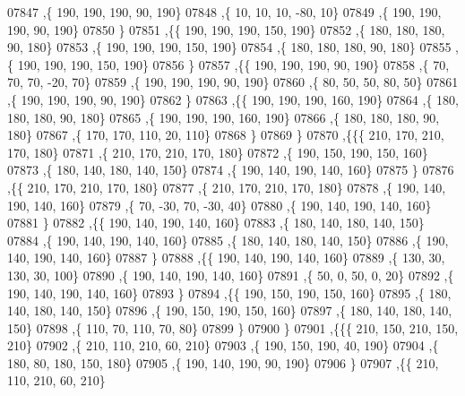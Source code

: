 \begin{DoxyCode}
07847     ,\{   190,   190,   190,    90,   190\}
07848     ,\{    10,    10,    10,   -80,    10\}
07849     ,\{   190,   190,   190,    90,   190\}
07850     \}
07851    ,\{\{   190,   190,   190,   150,   190\}
07852     ,\{   180,   180,   180,    90,   180\}
07853     ,\{   190,   190,   190,   150,   190\}
07854     ,\{   180,   180,   180,    90,   180\}
07855     ,\{   190,   190,   190,   150,   190\}
07856     \}
07857    ,\{\{   190,   190,   190,    90,   190\}
07858     ,\{    70,    70,    70,   -20,    70\}
07859     ,\{   190,   190,   190,    90,   190\}
07860     ,\{    80,    50,    50,    80,    50\}
07861     ,\{   190,   190,   190,    90,   190\}
07862     \}
07863    ,\{\{   190,   190,   190,   160,   190\}
07864     ,\{   180,   180,   180,    90,   180\}
07865     ,\{   190,   190,   190,   160,   190\}
07866     ,\{   180,   180,   180,    90,   180\}
07867     ,\{   170,   170,   110,    20,   110\}
07868     \}
07869    \}
07870   ,\{\{\{   210,   170,   210,   170,   180\}
07871     ,\{   210,   170,   210,   170,   180\}
07872     ,\{   190,   150,   190,   150,   160\}
07873     ,\{   180,   140,   180,   140,   150\}
07874     ,\{   190,   140,   190,   140,   160\}
07875     \}
07876    ,\{\{   210,   170,   210,   170,   180\}
07877     ,\{   210,   170,   210,   170,   180\}
07878     ,\{   190,   140,   190,   140,   160\}
07879     ,\{    70,   -30,    70,   -30,    40\}
07880     ,\{   190,   140,   190,   140,   160\}
07881     \}
07882    ,\{\{   190,   140,   190,   140,   160\}
07883     ,\{   180,   140,   180,   140,   150\}
07884     ,\{   190,   140,   190,   140,   160\}
07885     ,\{   180,   140,   180,   140,   150\}
07886     ,\{   190,   140,   190,   140,   160\}
07887     \}
07888    ,\{\{   190,   140,   190,   140,   160\}
07889     ,\{   130,    30,   130,    30,   100\}
07890     ,\{   190,   140,   190,   140,   160\}
07891     ,\{    50,     0,    50,     0,    20\}
07892     ,\{   190,   140,   190,   140,   160\}
07893     \}
07894    ,\{\{   190,   150,   190,   150,   160\}
07895     ,\{   180,   140,   180,   140,   150\}
07896     ,\{   190,   150,   190,   150,   160\}
07897     ,\{   180,   140,   180,   140,   150\}
07898     ,\{   110,    70,   110,    70,    80\}
07899     \}
07900    \}
07901   ,\{\{\{   210,   150,   210,   150,   210\}
07902     ,\{   210,   110,   210,    60,   210\}
07903     ,\{   190,   150,   190,    40,   190\}
07904     ,\{   180,    80,   180,   150,   180\}
07905     ,\{   190,   140,   190,    90,   190\}
07906     \}
07907    ,\{\{   210,   110,   210,    60,   210\}

\end{DoxyCode}
